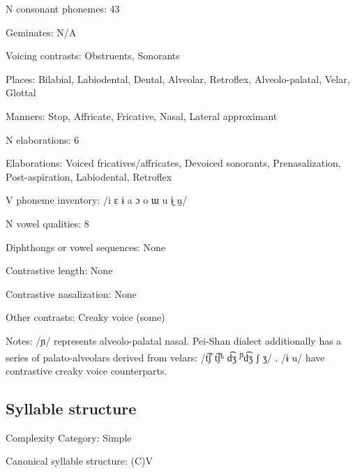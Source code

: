 {\begin{appendixdesc}
\item[N consonant phonemes:] 43

\item[Geminates:] N/A

\item[Voicing contrasts:] Obstruents, Sonorants

\item[Places:] Bilabial, Labiodental, Dental, Alveolar, Retroflex, Alveolo-palatal, Velar, Glottal

\item[Manners:] Stop, Affricate, Fricative, Nasal, Lateral approximant

\item[N elaborations:] 6

\item[Elaborations:] Voiced fricatives/affricates, Devoiced sonorants, Prenasalization, Post-aspiration, Labiodental, Retroflex

\item[V phoneme inventory:] /i ɛ ɨ a ɔ o ɯ u ɨ̰ ṵ/

\item[N vowel qualities:] 8

\item[Diphthongs or vowel sequences:] None

\item[Contrastive length:] None

\item[Contrastive nasalization:] None

\item[Other contrasts:] Creaky voice (some)

\item[Notes:] /ɲ/ represents alveolo-palatal nasal. Pei-Shan dialect additionally has a series of palato-alveolars derived from velars: /t͡ʃ t͡ʃʰ d͡ʒ \textsuperscript{ɲ}d͡ʒ ʃ ʒ/ \citep[68--69]{Maoji1997}. /ɨ u/ have contrastive creaky voice counterparts.
\end{appendixdesc}
\subsection*{Syllable structure}
\begin{appendixdesc}

\item[Complexity Category:] Simple

\item[Canonical syllable structure:] (C)V \citep[30--32]{Gerner2013}


\end{appendixdesc}}
